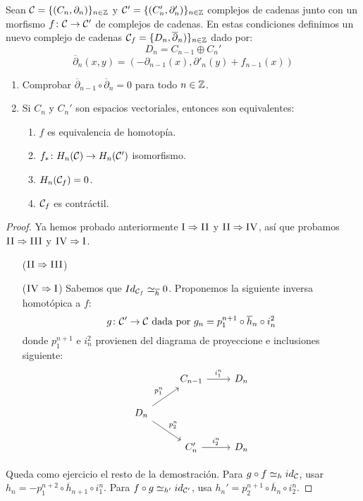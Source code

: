 \documentclass[HS.tex]{subfiles}
\begin{document}
\begin{prop}
Sean $\mathcal{C} = \{(C_n, \partial_n)\}_{n \in \mathbb{Z}}$ y $\mathcal{C}' = \{(C_n',\partial_n')\}_{n \in \mathbb{Z}}$ complejos de cadenas junto con un morfismo $f \colon \mathcal{C} \to \mathcal{C}'$ de complejos de cadenas. En estas condiciones definimos un nuevo complejo de cadenas $\mathcal{C}_f = \{D_n,\overline{\partial}_n)\}_{n \in \mathbb{Z}}$ dado por:
\[ D_n = C_{n-1} \oplus C_n' \]
\[ \overline{\partial}_n (x,y) = (-\partial_{n-1}(x), \partial'_n(y) + f_{n-1}(x)) \]
\begin{enumerate}
\item Comprobar $\overline{\partial}_{n-1} \circ \overline{\partial}_n = 0$ para todo $n \in \mathbb{Z}$.
\item Si $C_n$ y $C_n'$ son espacios vectoriales, entonces son equivalentes:
\begin{enumerate}[i]
\item $f$ es equivalencia de homotopía.
\item $f_* \colon H_n(\mathcal{C}) \to H_n(\mathcal{C}')$ isomorfismo.
\item $H_n(\mathcal{C}_f) = 0$.
\item $\mathcal{C}_f$ es contráctil.
\end{enumerate}
\end{enumerate}
\end{prop}
\begin{proof}\mbox{}
Ya hemos probado anteriormente $\textsc{I}\Rightarrow \textsc{II}$ y $\textsc{II}\Rightarrow \textsc{IV}$, así que probamos $\textsc{II}\Rightarrow \textsc{III}$ y $\textsc{IV}\Rightarrow \textsc{I}$.
\begin{itemize}
\item[($\textsc{II}\Rightarrow \textsc{III}$)]
\item[($\textsc{IV}\Rightarrow \textsc{I}$)]
Sabemos que $Id_{\mathcal{C}_f} \simeq_{\overline{h}} 0$. Proponemos la siguiente inversa homotópica a $f$:
\[ g \colon \mathcal{C}' \to \mathcal{C} \text{ dada por }g_n = p_1^{n+1} \circ \overline{h}_n \circ i_n^2\]
donde $p_1^{n+1}$ e $i_n^2$ provienen del diagrama de proyeccione e inclusiones siguiente:
\[
\begin{tikzcd}
& C_{n-1} \arrow[r,"i_1^n"] & D_n\\
D_n \arrow[ur,"p_1^n"] \arrow[dr,"p_2^n"]\\
& C_n' \arrow[r,"i_2^n"] & D_n
\end{tikzcd}
\]
\end{itemize}
Queda como ejercicio el resto de la demostración. Para $g \circ f \simeq_h id_{\mathcal{C}}$, usar $h_n = -p_1^{n+2} \circ \overline{h}_{n+1} \circ i_1^n$. Para $f \circ g \simeq_{h'} id_{\mathcal{C}'}$, usa $h_n' = p_2^{n+1} \circ \overline{h}_n \circ i_2^n$.
\end{proof}
\end{document}
